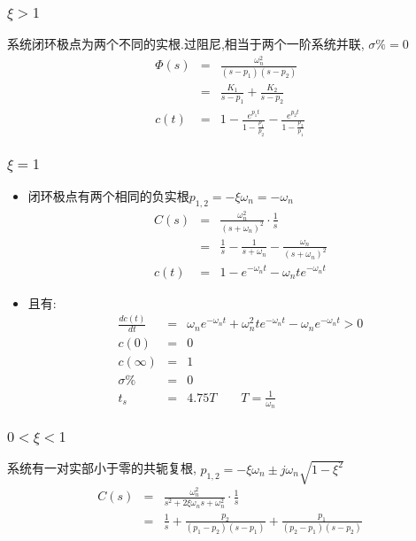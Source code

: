 \documentclass{beamer}
\begin{document}
\begin{frame}
\frametitle{$\xi>1$}
\label{sec-2-3}

   系统闭环极点为两个不同的实根.过阻尼,相当于两个一阶系统并联, $\sigma\%=0$
      \begin{eqnarray*}
      \Phi(s) & = & \frac{\omega_n^2}{(s-p_1)(s-p_2)} \\
              & = & \frac{K_1}{s-p_1}+\frac{K_2}{s-p_2}\\
      c(t)    &=& 1-\frac{e^{p_1 t}}{1-\frac{p_1}{p_2}}-\frac{e^{p_2 t}}{1-\frac{p_2}{p_1}}
      \end{eqnarray*}
\end{frame}
\begin{frame}
\frametitle{$\xi=1$}
\label{sec-2-4}

\begin{itemize}
\item <1-> 闭环极点有两个相同的负实根$p_{1,2}=-\xi\omega_n=-\omega_n$
      \begin{eqnarray*}
      C(s) & = &\frac{\omega_n^2}{(s+\omega_n)^2}\cdot\frac{1}{s} \\
           & = &\frac{1}{s}-\frac{1}{s+\omega_n}-\frac{\omega_n}{(s+\omega_n)^2} \\
      c(t) &=& 1-e^{-\omega_n t}-\omega_n t e^{-\omega_n t}
      \end{eqnarray*}
\item <2-> 且有:
      \begin{eqnarray*}
      \frac{dc(t)}{dt} &=& \omega_n e^{-\omega_n t}+\omega_n^2 t e^{-\omega_n t}-\omega_n e^{-\omega_n t}  >  0 \\
      c(0) &=&0 \\
      c(\infty)&=&1\\
      \sigma \% &=& 0\\
      t_s &=& 4.75T \qquad    T =\frac{1}{\omega_n}
      \end{eqnarray*}
\end{itemize}
\end{frame}
\begin{frame}
\frametitle{$0<\xi<1$}
\label{sec-2-5}

系统有一对实部小于零的共轭复根, $p_{1,2}  =  -\xi\omega_n\pm j\omega_n\sqrt{1-\xi^2}$
\begin{eqnarray*}
C(s) &=& \frac{\omega_n^2}{s^2+2\xi\omega_n s+\omega_n^2}\cdot\frac{1}{s} \\
     &=& \frac{1}{s}+\frac{p_2}{(p_1-p_2)(s-p_1)}+\frac{p_1}{(p_2-p_1)(s-p_2)} 
\end{eqnarray*}
\end{frame}
\end{document}
